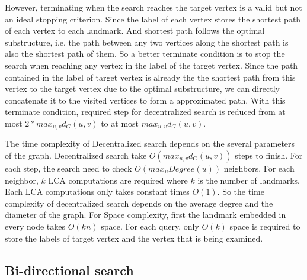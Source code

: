 However, terminating when the search reaches the target vertex is a valid but not an ideal stopping criterion. Since the label of each vertex stores the shortest path of each vertex to each landmark. And shortest path follows the optimal substructure, i.e. the path between any two vertices along the shortest path is also the shortest path of them. So a better terminate condition is to stop the search when reaching any vertex in the label of the target vertex. Since the path contained in the label of target vertex is already the the shortest path from this vertex to the target vertex due to the optimal substructure, we can directly concatenate it to the visited vertices to form a approximated path. With this terminate condition, required step for decentralized search is reduced from at most $2 * max_{u,v}d_G(u,v)$ to at most $max_{u,v}d_G(u,v)$. 

The time complexity of Decentralized search depends on the several parameters of the graph. Decentralized search take $O(max_{u,v}d_G(u,v))$ steps to finish. For each step, the search need to check $O(max_{u}Degree(u))$ neighbors. For each neighbor, $k$ LCA computations are required where $k$ is the number of landmarks. Each LCA computations only takes constant times $O(1)$. So the time complexity of decentralized search depends on the average degree and the diameter of the graph. For Space complexity, first the landmark embedded in every node takes $O(kn)$ space. For each query, only $O(k)$ space is required to store the labels of target vertex and the vertex that is being examined.

\subsection{Bi-directional search}

